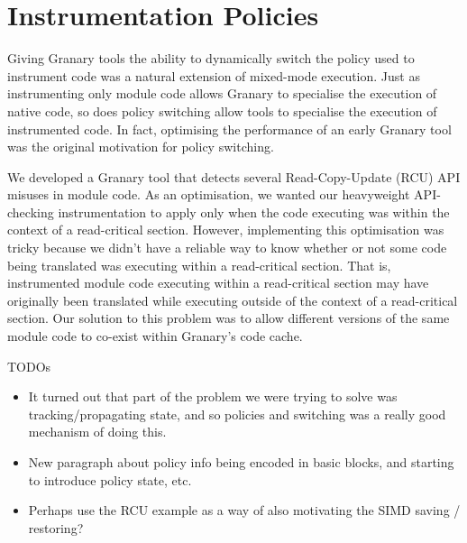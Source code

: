 \documentclass{sigplanconf}
\begin{document}
\section{Instrumentation Policies}\label{sec:policies}

Giving Granary tools the ability to dynamically switch the policy used to instrument code was a natural extension of mixed-mode execution. Just as instrumenting only module code allows Granary to specialise the execution of native code, so does policy switching allow tools to specialise the execution of instrumented code. In fact, optimising the performance of an early Granary tool was the original motivation for policy switching.

We developed a Granary tool that detects several Read-Copy-Update (RCU) API misuses in module code. As an optimisation, we wanted our heavyweight API-checking instrumentation to apply only when the code executing was within the context of a read-critical section. However, implementing this optimisation was tricky because we didn't have a reliable way to know whether or not some code being translated was executing within a read-critical section. That is, instrumented module code executing within a read-critical section may have originally been translated while executing outside of the context of a read-critical section. Our solution to this problem was to allow different versions of the same module code to co-exist within Granary's code cache.



TODOs \begin{itemize}
	\item It turned out that part of the problem we were trying to solve was tracking/propagating state, and so policies and switching was a really good mechanism of doing this.
	\item New paragraph about policy info being encoded in basic blocks, and starting to introduce policy state, etc.
	\item Perhaps use the RCU example as a way of also motivating the SIMD saving / restoring?
\end{itemize}
\end{document}
